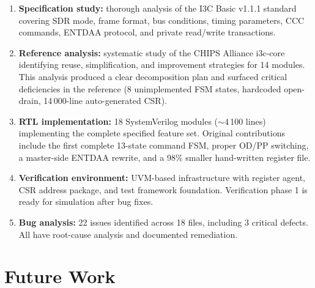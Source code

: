\documentclass[12pt, a4paper, oneside]{report}
\begin{document}
\begin{enumerate}
  \item \textbf{Specification study:} thorough analysis of the I3C Basic v1.1.1
        standard covering SDR mode, frame format, bus conditions, timing parameters,
        CCC commands, ENTDAA protocol, and private read/write transactions.

  \item \textbf{Reference analysis:} systematic study of the CHIPS Alliance i3c-core
        identifying reuse, simplification, and improvement strategies for 14 modules.
        This analysis produced a clear decomposition plan and surfaced critical
        deficiencies in the reference (8 unimplemented FSM states, hardcoded
        open-drain, 14\,000-line auto-generated CSR).

  \item \textbf{RTL implementation:} 18 SystemVerilog modules ($\sim$4\,100 lines)
        implementing the complete specified feature set. Original contributions include
        the first complete 13-state command FSM, proper OD/PP switching, a master-side
        ENTDAA rewrite, and a 98\% smaller hand-written register file.

  \item \textbf{Verification environment:} UVM-based infrastructure with register agent,
        CSR address package, and test framework foundation. Verification phase 1 is
        ready for simulation after bug fixes.

  \item \textbf{Bug analysis:} 22 issues identified across 18 files, including 3
        critical defects. All have root-cause analysis and documented remediation.
\end{enumerate}

\section{Future Work}
\end{document}
